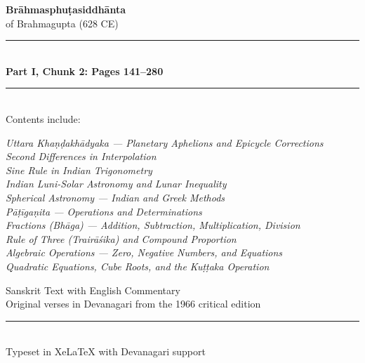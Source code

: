 \documentclass[11pt,a4paper]{article}
\newcommand{\longline}{\noindent\rule{\textwidth}{0.4pt}}
\begin{document}
\begin{titlepage}
\centering
\vspace*{2cm}

{\Huge\bfseries\color{titlecolor} Brāhmasphuṭasiddhānta}\\[0.8cm]
{\LARGE\color{sectioncolor} of Brahmagupta (628 CE)}\\[2cm]

\longline\\[0.5cm]
{\Large\bfseries Part I, Chunk 2: Pages 141--280}\\[0.3cm]
\longline\\[2cm]

{\large Contents include:}\\[0.5cm]
\begin{minipage}{0.7\textwidth}
\centering
\textit{Uttara Khaṇḍakhādyaka --- Planetary Aphelions and Epicycle Corrections\\[0.2cm]
Second Differences in Interpolation\\[0.2cm]
Sine Rule in Indian Trigonometry\\[0.2cm]
Indian Luni-Solar Astronomy and Lunar Inequality\\[0.2cm]
Spherical Astronomy --- Indian and Greek Methods\\[0.2cm]
Pāṭīgaṇita --- Operations and Determinations\\[0.2cm]
Fractions (Bhāga) --- Addition, Subtraction, Multiplication, Division\\[0.2cm]
Rule of Three (Trairāśika) and Compound Proportion\\[0.2cm]
Algebraic Operations --- Zero, Negative Numbers, and Equations\\[0.2cm]
Quadratic Equations, Cube Roots, and the Kuṭṭaka Operation}
\end{minipage}

\vfill

{\large Sanskrit Text with English Commentary}\\[0.3cm]
{\small Original verses in Devanagari from the 1966 critical edition}\\[1cm]

\longline\\[0.3cm]
{\small Typeset in XeLaTeX with Devanagari support}

\end{titlepage}
\end{document}
